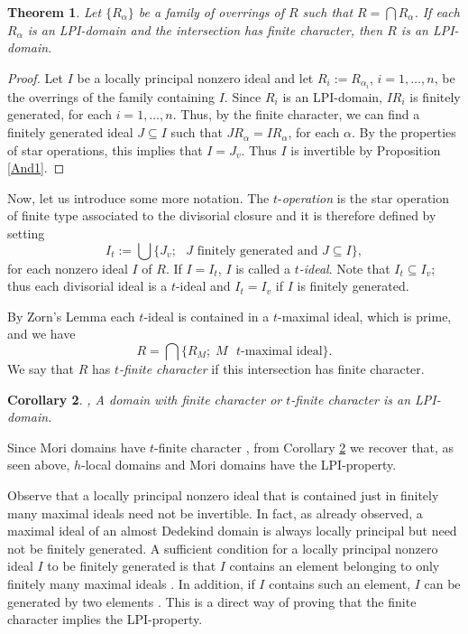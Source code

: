 \documentclass[12pt]{amsart}
\newtheorem{theorem}{Theorem}
\newtheorem{corollary}[theorem]{Corollary}
\theoremstyle{definition}
\begin{document}
\begin{theorem} \cite[Theorem 4]{AZ} Let $\{R_{\alpha}\}$ be a family of overrings of $R$ such that $R=\bigcap R_{\alpha}$. If each $R_{\alpha}$ is an LPI-domain and the intersection has finite character, then $R$ is an LPI-domain.
\end{theorem}
\begin{proof} Let $I$ be a locally principal nonzero ideal and let $R_i:=R_{{\alpha}_i}$, $i=1, \dots, n$, be the overrings of the family containing $I$. Since $R_i$ is an LPI-domain, $IR_i$ is finitely generated, for each $i=1, \dots, n$. Thus, by the finite character, we can find a finitely generated ideal $J{\subseteq} I$ such that $JR_{\alpha}=IR_{\alpha}$, for each ${\alpha}$. By the properties of star operations, this implies that $I=J_v$. Thus $I$ is invertible by Proposition \ref{And1}.
\end{proof}

Now, let us introduce some more notation.
 The $t$-\emph{operation} is the star operation of finite type associated to the divisorial closure and it is therefore defined by setting 
$$I_t:=\bigcup\{J_v;   \mbox{ $J$ finitely generated and $J{\subseteq} I$}\},$$
for each nonzero ideal $I$ of $R$. If $I=I_t$, $I$ is called a \emph{$t$-ideal}. Note that $I_t{\subseteq} I_v$; thus each divisorial ideal is a $t$-ideal and $I_t=I_v$ if $I$ is finitely generated.

By Zorn's Lemma each $t$-ideal is contained in
a $t$-maximal ideal, which is prime, and we have 
$$R=\bigcap \{R_{M};\; M \mbox{ $t$-maximal ideal}\}.$$ 
We say that $R$ has \emph{$t$-finite character} if this intersection has finite character. 

\begin{corollary} \label{FC} \cite[Corollary 1]{AZ}, \cite[Proposition 1.3]{PT}
A domain with finite character or $t$-finite character  is an LPI-domain.
\end{corollary}

Since Mori domains have $t$-finite character \cite[Theorem 3.3]{Bar},
from Corollary \ref{FC} we recover that, as seen above,  $h$-local domains and Mori domains have the LPI-property.

Observe that a locally principal nonzero  ideal that is contained just in finitely many maximal ideals need not be invertible. In fact, as already observed, a maximal ideal of an almost Dedekind domain is always locally principal but need not be finitely generated. A sufficient condition for a locally principal nonzero  ideal $I$ to be finitely generated is that $I$ contains an element belonging  to only finitely many maximal ideals \cite[Lemma 37.3]{gilmer}. In addition, if $I$ contains such an element, $I$ can be generated by two elements \cite[Corollary 1]{GH}.
This is a direct way of proving that the finite character implies the LPI-property. 
\end{document}
